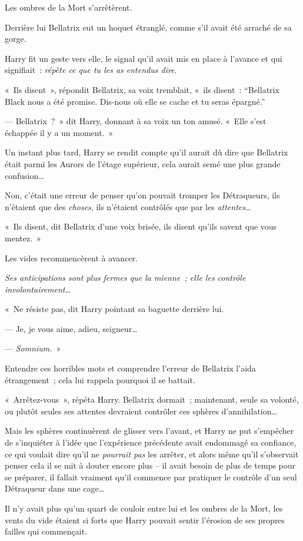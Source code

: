 Les ombres de la Mort s'arrêtèrent.

Derrière lui Bellatrix eut un hoquet étranglé, comme s'il avait été arraché de sa gorge.

Harry fit un geste vers elle, le signal qu'il avait mis en place à l'avance et qui signifiait~: \emph{répète ce que tu les as entendus dire}.

«~Ils disent~», répondit Bellatrix, sa voix tremblait, «~ils disent~: “Bellatrix Black nous a été promise.
Dis-nous où elle se cache et tu seras épargné.”

--- Bellatrix~?~»
dit Harry, donnant à sa voix un ton amusé.
«~Elle s'est échappée il y a un moment.~»

Un instant plus tard, Harry se rendit compte qu'il aurait dû dire que Bellatrix était parmi les Aurors de l'étage supérieur, cela aurait semé une plus grande confusion…

Non, c'était une erreur de penser qu'on pouvait tromper les Détraqueurs, ils n'étaient que des \emph{choses}, ils n'étaient contrôlés que par les \emph{attentes}…

«~Ils disent, dit Bellatrix d'une voix brisée, ils disent qu'ils savent que vous mentez.~»

Les vides recommencèrent à avancer.

\emph{Ses anticipations sont plus fermes que la mienne~; elle les contrôle involontairement…}

«~Ne résiste pas, dit Harry pointant sa baguette derrière lui.

--- Je, je vous aime, adieu, seigneur…

--- \emph{Somnium.}~»

Entendre ces horribles mots et comprendre l'erreur de Bellatrix l'aida étrangement~; cela lui rappela pourquoi il se battait.

«~Arrêtez-vous~», répéta Harry.
Bellatrix dormait~; maintenant, seule sa volonté, ou plutôt seules ses attentes devraient contrôler ces sphères d'annihilation…

Mais les sphères continuèrent de glisser vers l'avant, et Harry ne put s'empêcher de s'inquiéter à l'idée que l'expérience précédente avait endommagé sa confiance, ce qui voulait dire qu'il ne \emph{pourrait pas} les arrêter, et alors même qu'il s'observait penser cela il se mit à douter encore plus -- il avait besoin de plus de temps pour se préparer, il fallait vraiment qu'il commence par pratiquer le contrôle d'un seul Détraqueur dans une cage…

Il n'y avait plus qu'un quart de couloir entre lui et les ombres de la Mort, les vents du vide étaient si forts que Harry pouvait sentir l'érosion de ses propres failles qui commençait.

